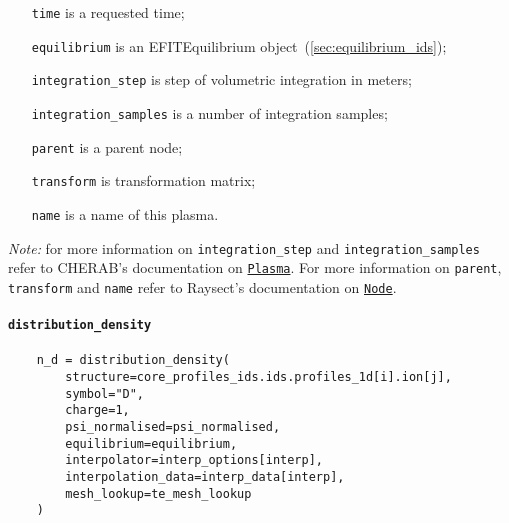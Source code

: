 \documentclass[../../main.tex]{subfiles}
\begin{document}
\begin{itemize}[align=left]
    \item[\texttt{time}] is a requested time;
    \item[\texttt{equilibrium}] is an EFITEquilibrium object~(\cref{sec:equilibrium_ids});
    \item[\texttt{integration\_step}] is step of volumetric integration in meters;
    \item[\texttt{integration\_samples}] is a number of integration samples;
    \item[\texttt{parent}] is a parent node;
    \item[\texttt{transform}] is transformation matrix;
    \item[\texttt{name}] is a name of this plasma.
\end{itemize}
\emph{Note: } for more information on \texttt{integration\_step} and \texttt{integration\_samples} refer to CHERAB's documentation on \href{https://cherab.github.io/documentation/plasmas/edge_plasma_classes.html?highlight=plasma#cherab.edge.Plasma}{\texttt{Plasma}}.
For more information on \texttt{parent}, \texttt{transform} and \texttt{name} refer to Raysect's documentation on \href{https://raysect.github.io/documentation/api_reference/edge/raysect_edge_scenegraph.html?highlight=node#raysect.edge.scenegraph.node.Node}{\texttt{Node}}.

\paragraph{\texttt{distribution\_density}}%

\begin{verbatim}
    n_d = distribution_density(
        structure=core_profiles_ids.ids.profiles_1d[i].ion[j],
        symbol="D",
        charge=1,
        psi_normalised=psi_normalised,
        equilibrium=equilibrium,
        interpolator=interp_options[interp],
        interpolation_data=interp_data[interp],
        mesh_lookup=te_mesh_lookup
    )
\end{verbatim}
\end{document}
